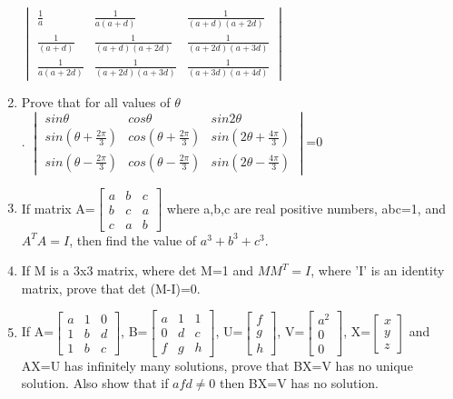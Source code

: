\begin{enumerate}[label=\arabic*.,ref=\thesubsection.\theenumi]
 $\begin{vmatrix} \frac{1}{a} & \frac{1}{a(a+d)} & \frac{1}{(a+d)(a+2d)} \\ \frac{1}{(a+d)} & \frac{1}{(a+d)(a+2d)} & \frac{1}{(a+2d)(a+3d)} \\ \frac{1}{a(a+2d)} & \frac{1}{(a+2d)(a+3d)} & \frac{1}{(a+3d)(a+4d)}\end{vmatrix}$\\
\item Prove that for all values of $\theta$\\.  
$\begin{vmatrix} sin\theta & cos\theta  & sin2\theta \\ sin(\theta+\frac{2\pi}{3}) & cos(\theta+\frac{2\pi}{3}) & sin(2\theta+\frac{4\pi}{3}) \\ sin(\theta-\frac{2\pi}{3}) & cos(\theta-\frac{2\pi}{3}) & sin(2\theta-\frac{4\pi}{3})\end{vmatrix}$=0 \\
\item If matrix A=$\begin{bmatrix} a & b & c \\ b & c & a \\ c & a & b\end{bmatrix}$ where a,b,c are real positive numbers, abc=1, and $A^TA=I$, then find the value of $a^3+b^3+c^3$.
\item If M is a 3x3 matrix, where det M=1 and  $MM^T=I$, where 'I' is an identity matrix, prove that det (M-I)=0.
\item If A=$\begin{bmatrix} a & 1 & 0 \\ 1 & b & d \\ 1 & b & c\end{bmatrix}$, B=$\begin{bmatrix} a & 1 & 1 \\ 0 & d & c \\ f & g & h\end{bmatrix}$, U=$\begin{bmatrix} f \\ g \\ h\end{bmatrix}$, V=$\begin{bmatrix} a^2 \\ 0 \\ 0\end{bmatrix}$, X=$\begin{bmatrix} x \\ y \\ z\end{bmatrix}$ and AX=U has infinitely many solutions, prove that BX=V has no unique solution. Also show that if $afd \neq 0$ then BX=V has no solution.

\end{enumerate}
